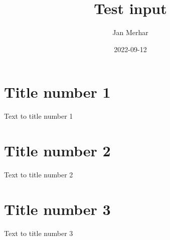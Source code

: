 \documentclass{article}
\author{ Jan Merhar }
\date{ 2022-09-12 }
\title{ Test input }
\begin{document}
\maketitle

    \section*{  Title number 1  }
    Text to title number 1
    \section*{ Title number 2 }
    Text to title number 2

    \section*{ Title number 3 }

    Text to title number 3
\end{document}

